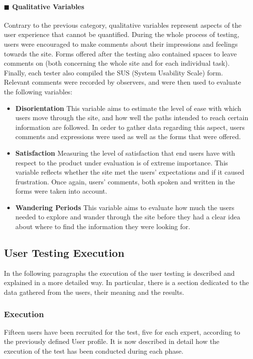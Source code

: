 \documentclass[11pt]{article} %
\begin{document}
\paragraph{$\blacksquare$ Qualitative Variables}
Contrary to the previous category, qualitative variables represent aspects of the user experience that cannot be quantified. During the whole process of testing, users were encouraged to make comments about their impressions and feelings towards the site. Forms offered after the testing also contained spaces to leave comments on (both concerning the whole site and for each individual task). Finally, each tester also compiled the SUS (System Usability Scale) form. Relevant comments were recorded by observers, and were then used to evaluate the following variables:

\begin{itemize}
    \item \textbf{Disorientation}
    This variable aims to estimate the level of ease with which users move through the site, and how well the paths intended to reach certain information are followed. In order to gather data regarding this aspect, users comments and expressions were used as well as the forms that were offered. 
    \item \textbf{Satisfaction}
    Measuring the level of satisfaction that end users have with respect to the product under evaluation is of extreme importance. This variable reflects whether the site met the users' expectations and if it caused frustration. Once again, users' comments, both spoken and written in the forms were taken into account.
    \item \textbf{Wandering Periods}
    This variable aims to evaluate how much the users needed to explore and wander through the site before they had a clear idea about where to find the information they were looking for.
    
\end{itemize}

\subsection{User Testing Execution}
In the following paragraphs the execution of the user testing is described and explained in a more detailed way. In particular, there is a section dedicated to the data gathered from the users, their meaning and the results.
\subsubsection{Execution}
Fifteen users have been recruited for the test, five for each expert, according to the previously defined User profile.  It is now described in detail how the execution of the test has been conducted during each phase.
\end{document}
